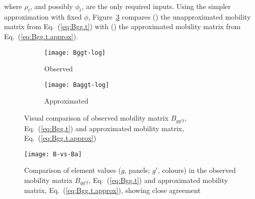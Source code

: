 where $\rho_{t}$, and possibly $\phi_{t}$, are the only required inputs.
Using the simpler approximation with fixed $\phi$, Figure~\ref{fig:Bggt}
compares () the unapproximated mobility matrix from Eq.~(\ref{eq:Bgg.t})
with () the approximated mobility matrix from Eq.~(\ref{eq:Bgg.t.approx}).
\begin{figure}[ht]
  \begin{subfigure}{\linewidth}
    \texttt{[image: Bggt-log]}
    \caption{Observed}
    \label{fig:Bggt-orig}
  \end{subfigure}
  \begin{subfigure}{\linewidth}
    \texttt{[image: Baggt-log]}
    \caption{Approximated}
    \label{fig:Bggt-approx}
  \end{subfigure}
  \caption{Visual comparison of
    observed mobility matrix $B_{gg't}$, Eq.~(\ref{eq:Bgg.t}) and
    approximated mobility matrix, Eq.~(\ref{eq:Bgg.t.approx})}
  \label{fig:Bggt}
\end{figure}
\begin{figure}[ht]
  \centering
  \texttt{[image: B-vs-Ba]}
  \caption{Comparison of element values ($g$, panels; $g'$, colours) in the
    observed mobility matrix $B_{gg't}$, Eq.~(\ref{eq:Bgg.t}) and
    approximated mobility matrix, Eq.~(\ref{eq:Bgg.t.approx}),
    showing close agreement}
  \label{fig:B.vs.Ba}
\end{figure}
\clearpage
